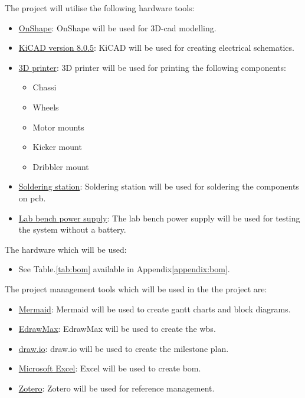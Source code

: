 The project will utilise the following hardware tools:
\begin{itemize}
    \item \href{https://www.onshape.com/en/}{OnShape}: OnShape will be used for 3D-\acs{cad} modelling.
    \item \href{https://www.kicad.org/}{KiCAD version 8.0.5}: KiCAD will be used for creating electrical schematics.
    \item \href{}{3D printer}: 3D printer will be used for printing the following components:
    \begin{itemize}
        \item Chassi
        \item Wheels
        \item Motor mounts
        \item Kicker mount
        \item Dribbler mount
    \end{itemize}
    \item \href{}{Soldering station}: Soldering station will be used for soldering the components on \ac{pcb}.
    \item \href{}{Lab bench power supply}: The lab bench power supply will be used for testing the system without a battery.
\end{itemize}

The hardware which will be used:
\begin{itemize}
    \item See Table.\:\ref{tab:bom} available in Appendix\:\ref{appendix:bom}.
\end{itemize}

The project management tools which will be used in the the project are:
\begin{itemize}
    \item \href{https://mermaid.js.org/}{Mermaid}: Mermaid will be used to create gantt charts and block diagrams.
    \item \href{https://www.edrawmax.com/}{EdrawMax}: EdrawMax will be used to create the \ac{wbs}.
    \item \href{https://www.drawio.com/}{draw.io}: draw.io will be used to create the milestone plan.
    \item \href{https://www.microsoft.com/en-us/microsoft-365/excel}{Microsoft Excel}: Excel will be used to create \ac{bom}.
    \item \href{https://www.zotero.org/}{Zotero}: Zotero will be used for reference management.
\end{itemize}

